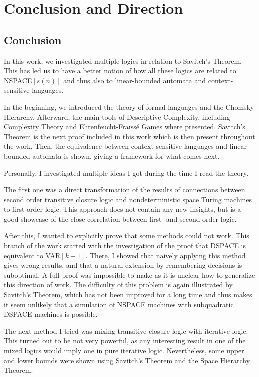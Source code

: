 \chapter{Conclusion and Direction}\label{ch:conclusion-and-direction}

\section{Conclusion}\label{sec:conclusion}
In this work, we investigated multiple logics in relation to Savitch's Theorem.
This has led us to have a better notion of how all these logics are related to NSPACE$[s(n)]$ and thus also to linear-bounded automata and context-sensitive languages.

In the beginning, we introduced the theory of formal languages and the Chomsky Hierarchy.
Afterward, the main tools of Descriptive Complexity, including Complexity Theory and Ehrenfeucht-Fraïssé Games where presented.
Savitch's Theorem is the next proof included in this work which is then present throughout the work.
Then, the equivalence between context-sensitive languages and linear bounded automata is shown, giving a framework for what comes next.

Personally, I investigated multiple ideas I got during the time I read the theory.

The first one was a direct transformation of the results of connections between second order transitive closure logic and nondeterministic space Turing machines to first order logic.
This approach does not contain any new insights, but is a good showcase of the close correlation between first- and second-order logic.

After this, I wanted to explicitly prove that some methods could not work.
This branch of the work started with the investigation of the proof that DSPACE is equivalent to VAR$[k + 1]$.
There, I showed that naively applying this method gives wrong results, and that a natural extension by remembering decisions is suboptimal.
A full proof was impossible to make as it is unclear how to generalize this direction of work.
The difficulty of this problem is again illustrated by Savitch's Theorem, which has not been improved for a long time and thus makes it seem unlikely that a simulation of NSPACE machines with subquadratic DSPACE machines is possible.

The next method I tried was mixing transitive closure logic with iterative logic.
This turned out to be not very powerful, as any interesting result in one of the mixed logics would imply one in pure iterative logic.
Nevertheless, some upper and lower bounds were shown using Savitch's Theorem and the Space Hierarchy Theorem.

